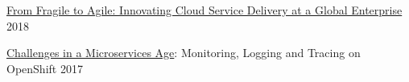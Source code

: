 
\begin{cvactivities}

  \cvactivity
    {\href{https://speakerdeck.com/getcloudnative/innovating-cloud-service-delivery-at-a-global-enterprise}{From Fragile to Agile: Innovating Cloud Service Delivery at a Global Enterprise}}
    {}
    {2018}

  \cvactivity
    {\href{https://www.slideshare.net/MartinEtmajer/challenges-in-a-microservices-age-monitoring-logging-and-tracing-on-red-hat-openshift}{Challenges in a Microservices Age}: Monitoring, Logging and Tracing on OpenShift}
    {}
    {2017}


  

\end{cvactivities}
